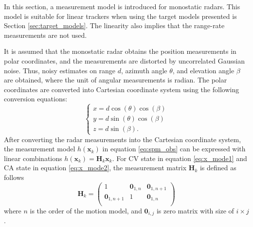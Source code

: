 \documentclass[english, 12pt, a4paper, elec, utf8, a-1b, online]{aaltothesis}
\renewcommand{\vec}[1]{\mathbf{#1}}
\newcommand{\x}{\vec{x}_k}
\newcommand{\omodel}{\vec{H}_k}
\begin{document}
In this section, a measurement model is introduced for monostatic radars.
This model is suitable for linear trackers when using the target models presented is Section \ref{sec:target_models}.
The linearity also implies that the range-rate measurements are not used.

It is assumed that the monostatic radar obtains the position measurements in polar coordinates, and the measurements are distorted by uncorrelated Gaussian noise.
Thus, noisy estimates on range $d$, azimuth angle $\theta$, and elevation angle $\beta$ are obtained, where the unit of angular measurements is radian. 
The polar coordinates are converted into Cartesian coordinate system using the following conversion equations:
\begin{equation}
\left\{
\begin{array}{l}
    x = d \cos(\theta) \cos(\beta) \\
    y = d \sin(\theta) \cos(\beta) \\
    z = d \sin(\beta).
\end{array}\right.
\end{equation}
After converting the radar measurements into the Cartesian coordinate system, the measurement model $h(\x)$ in equation \eqref{eq:spm_obs} can be expressed with linear combinations $h(\x) = \omodel \x$.
For CV state in equation \eqref{eq:x_mode1} and CA state in equation \eqref{eq:x_mode2}, the measurement matrix $\omodel$ is defined as follows
\begin{equation}\label{eq:position_measurement_matrix}
    \omodel = 
       \begin{pmatrix}
            1 & \vec{0}_{1, n} & \vec{0}_{1, n+1}\\ 
            \vec{0}_{1, n+1} & 1 & \vec{0}_{1, n}\\ 
        \end{pmatrix}
\end{equation}
where $n$ is the order of the motion model, and $\vec{0}_{i,j}$ is zero matrix with size of $i\times j$.
\end{document}
